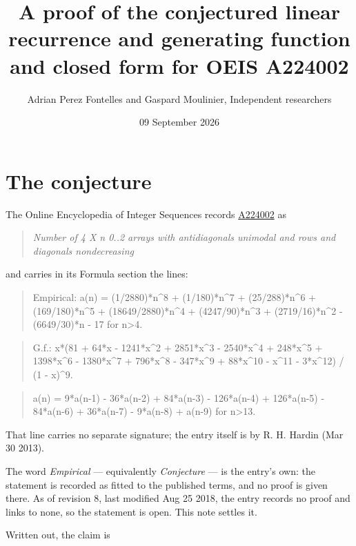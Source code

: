 \documentclass[11pt]{article}
\title{A proof of the conjectured linear recurrence and generating function and closed form for OEIS A224002}
\author{Adrian Perez Fontelles and Gaspard Moulinier, Independent researchers}
\date{09 September 2026}
\theoremstyle{definition}
\begin{document}
\maketitle
\section{The conjecture}

The Online Encyclopedia of Integer Sequences records \href{https://oeis.org/A224002}{A224002} as

\begin{quote}\itshape Number of 4 X n 0..2 arrays with antidiagonals unimodal and rows and diagonals nondecreasing\end{quote}

and carries in its Formula section the lines:

\begin{quote}\ttfamily Empirical: a(n) = (1/2880)*n\textasciicircum{}8 + (1/180)*n\textasciicircum{}7 + (25/288)*n\textasciicircum{}6 + (169/180)*n\textasciicircum{}5 + (18649/2880)*n\textasciicircum{}4 + (4247/90)*n\textasciicircum{}3 + (2719/16)*n\textasciicircum{}2 - (6649/30)*n - 17 for n>4.\end{quote}

\begin{quote}\ttfamily G.f.: x*(81 + 64*x - 1241*x\textasciicircum{}2 + 2851*x\textasciicircum{}3 - 2540*x\textasciicircum{}4 + 248*x\textasciicircum{}5 + 1398*x\textasciicircum{}6 - 1380*x\textasciicircum{}7 + 796*x\textasciicircum{}8 - 347*x\textasciicircum{}9 + 88*x\textasciicircum{}10 - x\textasciicircum{}11 - 3*x\textasciicircum{}12) / (1 - x)\textasciicircum{}9.\end{quote}

\begin{quote}\ttfamily a(n) = 9*a(n-1) - 36*a(n-2) + 84*a(n-3) - 126*a(n-4) + 126*a(n-5) - 84*a(n-6) + 36*a(n-7) - 9*a(n-8) + a(n-9) for n>13.\end{quote}

That line carries no separate signature; the entry itself is by R. H. Hardin (Mar 30 2013).

The word {\itshape Empirical} --- equivalently {\itshape Conjecture} --- is the entry's own: the statement is recorded as fitted to the published terms, and no proof is given there. As of revision 8, last modified Aug 25 2018, the entry records no proof and links to none, so the statement is open. This note settles it.

Written out, the claim is
\end{document}
